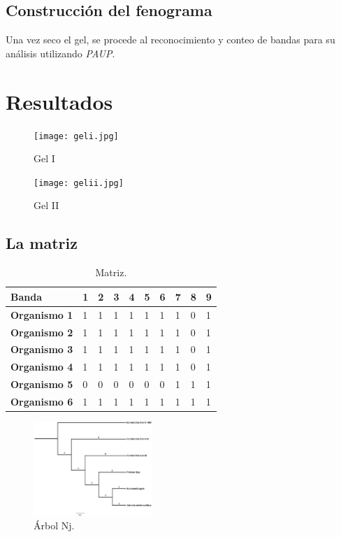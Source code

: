 \documentclass[%
 reprint,
 amsmath,amssymb,
 aps,
showkeys
]{revtex4-1}
\begin{document}
	\subsection{\label{sec:Fen}Construcción del fenograma}	
		Una vez seco el gel, se procede al reconocimiento y conteo de bandas para su análisis utilizando \textit{PAUP}.
		
	
\section{\label{sec:Resul}Resultados}

	\begin{figure}[h]
	\texttt{[image: geli.jpg]}
	\caption{Gel I}
	\label{Imagen: gelI}
	\end{figure} 
	
	\begin{figure}[h]
	\texttt{[image: gelii.jpg]}
	\caption{Gel II}
	\label{Imagen:gelII}
	\end{figure} 
	
	\subsection{La matriz}
	
	\begin{table}[h]
		\centering
		\large
		\caption{Matriz.}
		\label{tabla:autores}
		
		\begin{tabular}{|l||l|l|l|l|l|l|l|l|l|} \hline
		\textbf{Banda} & \textbf{1} & \textbf{2} & \textbf{3} & \textbf{4} & \textbf{5} & \textbf{6} & \textbf{7} & \textbf{8} & \textbf{9}\\ \hline \hline
		\textbf{Organismo 1} & 1 & 1 & 1 & 1 & 1 & 1 & 1 & 0 & 1\\ \hline
		\textbf{Organismo 2} & 1 & 1 & 1 & 1 & 1 & 1 & 1 & 0 & 1\\ \hline
		\textbf{Organismo 3} & 1 & 1 & 1 & 1 & 1 & 1 & 1 & 0 & 1\\ \hline
		\textbf{Organismo 4} & 1 & 1 & 1 & 1 & 1 & 1 & 1 & 0 & 1\\ \hline
		\textbf{Organismo 5} & 0 & 0 & 0 & 0 & 0 & 0 & 1 & 1 & 1\\ \hline
		\textbf{Organismo 6} & 1 & 1 & 1 & 1 & 1 & 1 & 1 & 1 & 1\\ \hline
		\end{tabular}
	\end{table}	

	\begin{figure}[h]
	\includegraphics[width=0.4\textwidth]{arbolNj.jpg}
	\caption{Árbol Nj.}
	\label{Grafica:Nj}	
	\end{figure}
\end{document}
